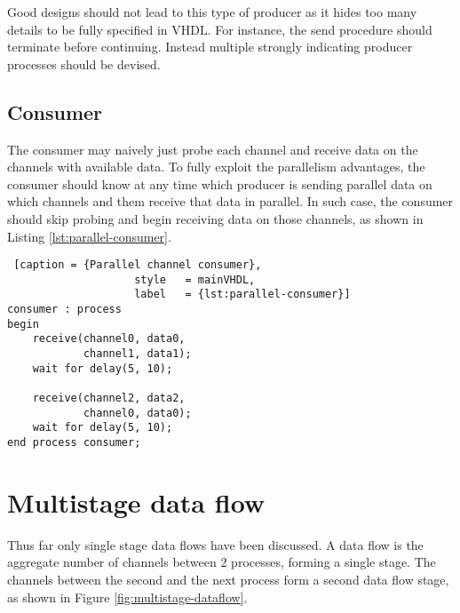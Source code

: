\documentclass{report}
\begin{document}
Good designs should not lead to this type of producer as it hides too many
details to be fully specified in VHDL. For instance, the send procedure should
terminate before continuing. Instead multiple strongly indicating producer
processes should be devised.

\subsection{Consumer}

The consumer may naively just probe each channel and receive data on the
channels with available data. To fully exploit the parallelism advantages, the
consumer should know at any time which producer is sending parallel data on
which channels and them receive that data in parallel. In such case, the
consumer should skip probing and begin receiving data on those channels, as
shown in Listing \ref{lst:parallel-consumer}.

\begin{lstlisting} [caption = {Parallel channel consumer},
                    style   = mainVHDL,
                    label   = {lst:parallel-consumer}]
consumer : process
begin
    receive(channel0, data0,
            channel1, data1);
    wait for delay(5, 10);

    receive(channel2, data2,
            channel0, data0);
    wait for delay(5, 10);
end process consumer;
\end{lstlisting}

\section{Multistage data flow}

Thus far only single stage data flows have been discussed. A data flow is the
aggregate number of channels between 2 processes, forming a single stage. The
channels between the second and the next process form a second data flow stage,
as shown in Figure \ref{fig:multistage-dataflow}.
\end{document}
